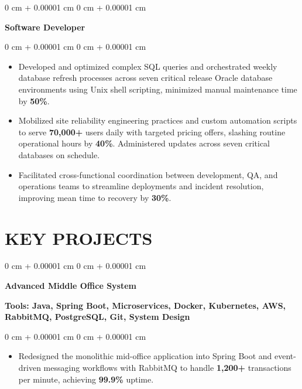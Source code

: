 \documentclass[10pt, letterpaper]{article}
\newenvironment{highlights}{
    \begin{itemize}[
        topsep=0.10 cm,
        parsep=0.10 cm,
        partopsep=0pt,
        itemsep=0pt,
        leftmargin=0 cm + 10pt
    ]
}{
    \end{itemize}
} %
\newenvironment{onecolentry}{
    \begin{adjustwidth}{
        0 cm + 0.00001 cm
    }{
        0 cm + 0.00001 cm
    }
}{
    \end{adjustwidth}
} %
\begin{document}
        \begin{onecolentry}
                \textbf{Software Developer}
        \end{onecolentry}

        \vspace{0.10 cm}
        \begin{onecolentry}
            \begin{highlights}
                \item Developed and optimized complex SQL queries and orchestrated weekly database refresh processes across seven critical release Oracle database environments using Unix shell scripting, minimized manual maintenance time by \textbf{50\%}.
                
                \item Mobilized site reliability engineering practices and custom automation scripts to serve \textbf{70,000+} users daily with targeted pricing offers, slashing routine operational hours by \textbf{40\%}. Administered updates across seven critical databases on schedule.

                
                \item Facilitated cross-functional coordination between development, QA, and operations teams to streamline deployments and incident resolution, improving mean time to recovery by \textbf{30\%}.
            \end{highlights}
        \end{onecolentry}
    
    \vspace{0.1 cm}
    \section{KEY PROJECTS}
    \vspace{0.1 cm}
        \begin{onecolentry}
            \textbf{Advanced Middle Office System}
        \end{onecolentry}
        \textbf{Tools: Java, Spring Boot, Microservices, Docker, Kubernetes, AWS, RabbitMQ, PostgreSQL, Git, System Design}

        \vspace{0.10 cm}
        \begin{onecolentry}
            \begin{highlights}
                \item Redesigned the monolithic mid-office application into Spring Boot and event-driven messaging workflows with RabbitMQ to handle \textbf{1,200+} transactions per minute, achieving \textbf{99.9\%} uptime.
            \end{highlights}
        \end{onecolentry}
\end{document}
